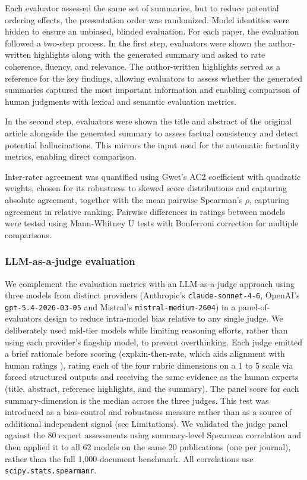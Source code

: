 Each evaluator assessed the same set of summaries, but to reduce potential ordering effects, the presentation order was randomized. Model identities were hidden to ensure an unbiased, blinded evaluation. For each paper, the evaluation followed a two-step process. In the first step, evaluators were shown the author-written highlights along with the generated summary and asked to rate coherence, fluency, and relevance. The author-written highlights served as a reference for the key findings, allowing evaluators to assess whether the generated summaries captured the most important information and enabling comparison of human judgments with lexical and semantic evaluation metrics.

In the second step, evaluators were shown the title and abstract of the original article alongside the generated summary to assess factual consistency and detect potential hallucinations. This mirrors the input used for the automatic factuality metrics, enabling direct comparison.

Inter-rater agreement was quantified using Gwet's AC2 coefficient \cite{bookgwet} with quadratic weights, chosen for its robustness to skewed score distributions and capturing absolute agreement, together with the mean pairwise Spearman's $\rho$, capturing agreement in relative ranking. Pairwise differences in ratings between models were tested using Mann-Whitney U tests with Bonferroni correction for multiple comparisons. 

\subsubsection{LLM-as-a-judge evaluation}
We complement the evaluation metrics with an LLM-as-a-judge approach \citep{zheng2023LLMAsAJudge} using three models from distinct providers (Anthropic's \texttt{claude-sonnet-4-6}, OpenAI's \texttt{gpt-5.4-2026-03-05} and Mistral's \texttt{mistral-medium-2604}) in a panel-of-evaluators design \citep{vergaReplacingJudgesJuries2024} to reduce intra-model bias relative to any single judge. We deliberately used mid-tier models while limiting reasoning efforts, rather than using each provider's flagship model, to prevent overthinking. Each judge emitted a brief rationale before scoring (explain-then-rate, which aids alignment with human ratings \citep{liuGEvalNLGEvaluation2023}), rating each of the four rubric dimensions on a 1 to 5 scale via forced structured outputs and receiving the same evidence as the human experts (title, abstract, reference highlights, and the summary). The panel score for each summary-dimension is the median across the three judges. This test was introduced as a bias-control and robustness measure rather than as a source of additional independent signal (see Limitations). We validated the judge panel against the 80 expert assessments using summary-level Spearman correlation and then applied it to all 62 models on the same 20 publications (one per journal), rather than the full 1,000-document benchmark. All correlations use \texttt{scipy.stats.spearmanr}.

